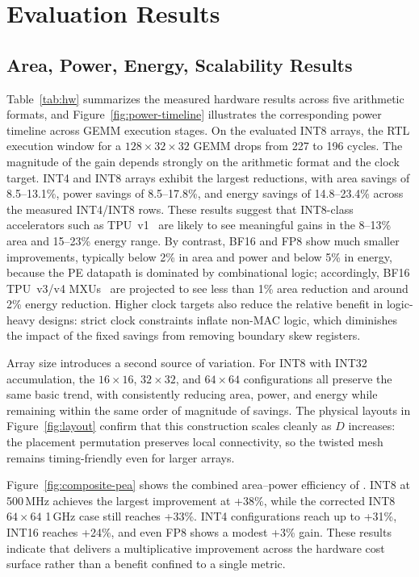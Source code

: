 
\section{Evaluation Results}
\label{sec:prelim}

\subsection{Area, Power, Energy, Scalability Results}

Table~\ref{tab:hw} summarizes the measured hardware results across five arithmetic formats, and Figure~\ref{fig:power-timeline} illustrates the corresponding power timeline across GEMM execution stages. On the evaluated INT8 arrays, the RTL execution window for a \(128 \times 32 \times 32\) GEMM drops from 227 to 196 cycles. The magnitude of the gain depends strongly on the arithmetic format and the clock target. INT4 and INT8 arrays exhibit the largest reductions, with area savings of 8.5--13.1\%, power savings of 8.5--17.8\%, and energy savings of 14.8--23.4\% across the measured INT4/INT8 rows. These results suggest that INT8-class accelerators such as TPU~v1~\cite{jouppi2017}  are likely to see meaningful gains in the 8--13\% area and 15--23\% energy range. By contrast, BF16 and FP8 show much smaller improvements, typically below 2\% in area and power and below 5\% in energy, because the PE datapath is dominated by combinational logic; accordingly, BF16 TPU~v3/v4 MXUs~\cite{jouppi2023tpuv4} are projected to see less than 1\% area reduction and around 2\% energy reduction. Higher clock targets also reduce the relative benefit in logic-heavy designs: strict clock constraints inflate non-MAC logic, which diminishes the impact of the fixed savings from removing boundary skew registers.

Array size introduces a second source of variation. For INT8 with INT32 accumulation, the \(16\times16\), \(32\times32\), and \(64\times64\) configurations all preserve the same basic trend, with \pipette{} consistently reducing area, power, and energy while remaining within the same order of magnitude of savings. The physical layouts in Figure~\ref{fig:layout} confirm that this construction scales cleanly as \(D\) increases: the placement permutation preserves local connectivity, so the twisted mesh remains timing-friendly even for larger arrays.

Figure~\ref{fig:composite-pea} shows the combined area--power efficiency of \pipette{}. INT8 at 500\,MHz achieves the largest improvement at +38\%, while the corrected INT8 \(64\times64\) 1\,GHz case still reaches +33\%. INT4 configurations reach up to +31\%, INT16 reaches +24\%, and even FP8 shows a modest +3\% gain. These results indicate that \pipette{} delivers a multiplicative improvement across the hardware cost surface rather than a benefit confined to a single metric.


